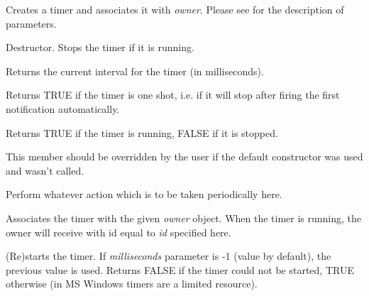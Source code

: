 Creates a timer and associates it with {\it owner}. Please see 
 for the description of parameters.



Destructor. Stops the timer if it is running.



Returns the current interval for the timer (in milliseconds).

\label{wxtimerisoneshot}


Returns TRUE if the timer is one shot, i.e. if it will stop after firing the
first notification automatically.

\label{wxtimerisrunning}


Returns TRUE if the timer is running, FALSE if it is stopped.

\label{wxtimernotify}


This member should be overridden by the user if the default constructor was
used and  wasn't called.

Perform whatever action which is to be taken periodically here.

\label{wxtimersetowner}


Associates the timer with the given {\it owner} object. When the timer is
running, the owner will receive  with
id equal to {\it id} specified here.

\label{wxtimerstart}


(Re)starts the timer. If {\it milliseconds} parameter is -1 (value by default),
the previous value is used. Returns FALSE if the timer could not be started,
TRUE otherwise (in MS Windows timers are a limited resource).

